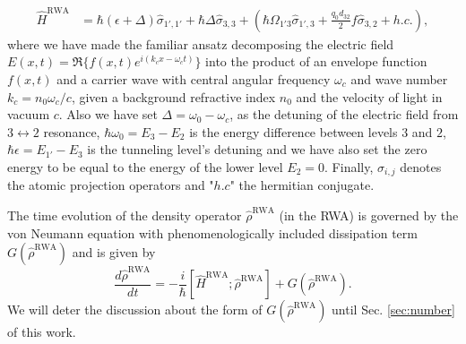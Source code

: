 \documentclass[]{spie}  %
\def\h{\hat}
\begin{document}
\begin{align}
\label{eq:hamiltonian-operatorform}
\h{H}^{\text{RWA}} &= \hbar(\epsilon + \Delta) \h\sigma_{1',1'} +\hbar\Delta\h\sigma_{3,3} +(\hbar\Omega_{1'3}\h\sigma_{1',3} +\frac{q_0d_{32}}{2}f \h\sigma_{3,2}+h.c.),
\end{align}
where we have made the familiar ansatz decomposing the electric field $E(x,t) = \Re\{f(x,t) e^{i(k_cx-\omega_c t)}\}$ into the product of an envelope function $f(x,t)$ and a carrier wave with central angular frequency $\omega_c$ and wave number $k_c = n_0\omega_c/c$, given a background refractive index $n_0$ and the velocity of light in vacuum $c$. Also we have set  $\Delta = \omega_0 -\omega_c$, as the detuning of the electric field from $3\leftrightarrow 2$ resonance, $\hbar\omega_0 = E_3-E_2$ is the energy difference between levels $3$ and $2$, $\hbar\epsilon = E_{1'}-E_{3}$ is the tunneling level's detuning and we have also set the zero energy to be equal to the energy of the lower level $E_2 = 0$. Finally, $\h \sigma_{i,j}$ denotes the atomic projection operators and "$h.c$" the hermitian conjugate. 

The time evolution of the density operator $\h{\rho}^{\text{RWA}}$ (in the RWA) is governed by the von Neumann equation with phenomenologically included dissipation term $G(\h{\rho}^{\text{RWA}})$ and is given by
\begin{equation}
\label{eq:vonNeumann}
\frac{d \h{\rho}^{\text{RWA}}}{dt} = -\frac{i}{\hbar}[\h{H}^{\text{RWA}};\h{\rho}^{\text{RWA}}] + G(\h{\rho}^{\text{RWA}}).
\end{equation}
We will deter the discussion about the form of $G(\h\rho^{\text{RWA}})$ until Sec. \ref{sec:number} of this work. 
\end{document}
